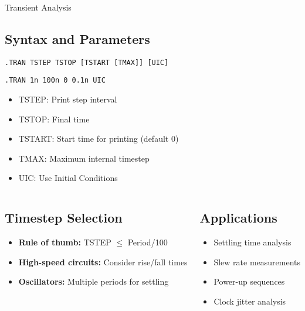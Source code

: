 \documentclass{beamer}
\begin{document}
\begin{frame}{Transient Analysis}
    \subsection{Syntax and Parameters}
    \texttt{.TRAN TSTEP TSTOP [TSTART [TMAX]] [UIC]}
    
    \texttt{.TRAN 1n 100n 0 0.1n UIC}
    \begin{itemize}
        \item TSTEP: Print step interval
        \item TSTOP: Final time
        \item TSTART: Start time for printing (default 0)
        \item TMAX: Maximum internal timestep
        \item UIC: Use Initial Conditions
    \end{itemize}
    
    \begin{columns}
        \begin{column}{0.5\textwidth}
            \subsection{Timestep Selection}
            \begin{itemize}
                \item \textbf{Rule of thumb:} TSTEP $\leq$ Period/100
                \item \textbf{High-speed circuits:} Consider rise/fall times
                \item \textbf{Oscillators:} Multiple periods for settling
            \end{itemize}
        \end{column}
        \begin{column}{0.5\textwidth}
            \subsection{Applications}
            \begin{itemize}
                \item Settling time analysis
                \item Slew rate measurements
                \item Power-up sequences
                \item Clock jitter analysis
            \end{itemize}
        \end{column}
    \end{columns}
\end{frame}
\end{document}
